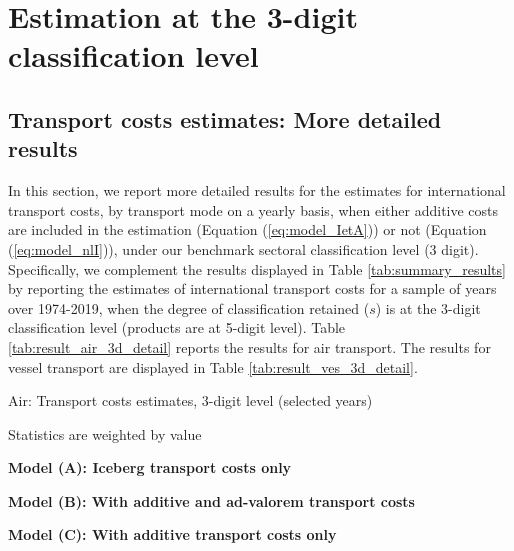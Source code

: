 \documentclass[a4paper,11pt]{article}
\begin{document}
\clearpage
\setcounter{table}{0}
\setcounter{figure}{0}
\renewcommand{\thefigure}{B.\arabic{figure}}
\renewcommand{\thetable}{B.\arabic{table}}

\section{Estimation at the 3-digit classification level \label{app:more_results}}

\subsection{Transport costs estimates: More detailed results}

In this section, we report more detailed results for the estimates for international transport costs, by transport mode on a yearly basis, when either additive costs are included in the estimation (Equation (\ref{eq:model_IetA})) or not (Equation (\ref{eq:model_nlI})), under our benchmark sectoral classification level (3 digit).
Specifically, we complement the results displayed in Table \ref{tab:summary_results} by reporting the estimates of international transport costs for a sample of years over 1974-2019, when the degree of classification retained ($s$) is at the 3-digit classification level (products are at 5-digit level).
Table \ref{tab:result_air_3d_detail} reports the results for air transport.
The results for vessel transport are displayed in Table \ref{tab:result_ves_3d_detail}.


\begin{table}[htbp]
	\centering
	\footnotesize{
	\caption{Air: Transport costs estimates, 3-digit level (selected years)}\vspace{5mm}
	\label{tab:result_air_3d_detail}%
	
   \begin{tablenotes}
	\tiny
	\item Statistics are weighted by value
	\item \textbf{Model (A): Iceberg transport costs only}
	\item \textbf{Model (B): With additive and ad-valorem transport costs}
				\item \textbf{Model (C): With additive transport costs only}
\end{tablenotes}

}	
\end{table}%
\end{document}
